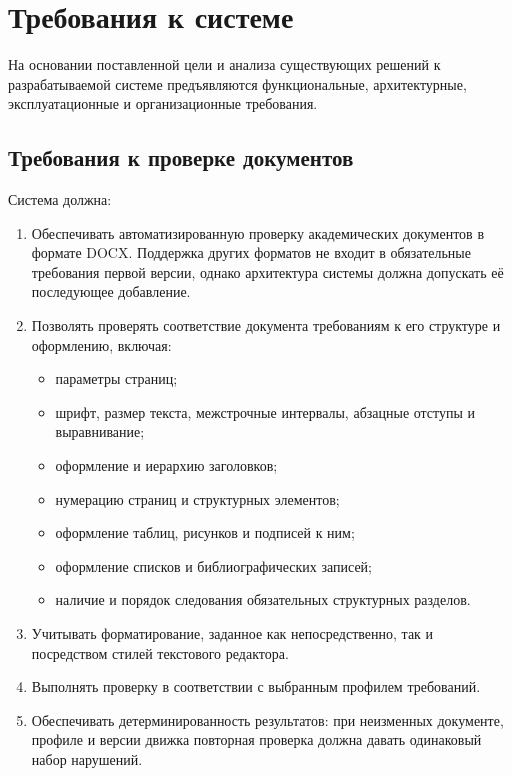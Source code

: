 \documentclass[a4paper,14pt]{extarticle}
\begin{document}
\section{Требования к системе}

На основании поставленной цели и анализа существующих решений к разрабатываемой системе предъявляются функциональные, архитектурные, эксплуатационные и организационные требования.

\subsection{Требования к проверке документов}

Система должна:

\begin{enumerate}
    \item Обеспечивать автоматизированную проверку академических документов в формате DOCX. Поддержка других форматов не входит в обязательные требования первой версии, однако архитектура системы должна допускать её последующее добавление.

    \item Позволять проверять соответствие документа требованиям к его структуре и оформлению, включая:
    \begin{itemize}
        \item параметры страниц;
        \item шрифт, размер текста, межстрочные интервалы, абзацные отступы и выравнивание;
        \item оформление и иерархию заголовков;
        \item нумерацию страниц и структурных элементов;
        \item оформление таблиц, рисунков и подписей к ним;
        \item оформление списков и библиографических записей;
        \item наличие и порядок следования обязательных структурных разделов.
    \end{itemize}

    \item Учитывать форматирование, заданное как непосредственно, так и посредством стилей текстового редактора.

    \item Выполнять проверку в соответствии с выбранным профилем требований.

    \item Обеспечивать детерминированность результатов: при неизменных документе, профиле и версии движка повторная проверка должна давать одинаковый набор нарушений.


\end{enumerate}
\end{document}
